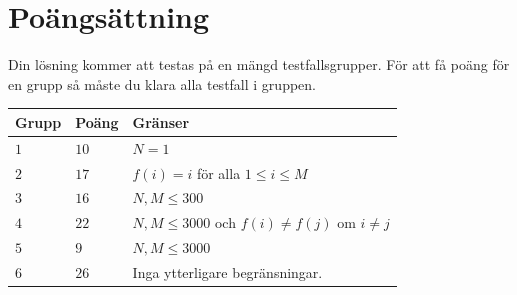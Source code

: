 \section*{Poängsättning}
Din lösning kommer att testas på en mängd testfallsgrupper.
För att få poäng för en grupp så måste du klara alla testfall i gruppen.

\noindent
\begin{tabular}{| l | l | p{12cm} |}
  \hline
  \textbf{Grupp} & \textbf{Poäng} & \textbf{Gränser} \\ \hline
  $1$    & $10$       & $N = 1$ \\ \hline
  $2$    & $17$       & $f(i) = i$ för alla $1 \leq i \leq M$ \\ \hline
  $3$    & $16$       & $N,M \leq 300$ \\ \hline
  $4$    & $22$       & $N,M \leq 3000$ och $f(i) \neq f(j)$ om $i \neq j$ \\ \hline
  $5$    & $9$       & $N,M \leq 3000$  \\ \hline
  $6$    & $26$       & Inga ytterligare begränsningar. \\ \hline
\end{tabular}


